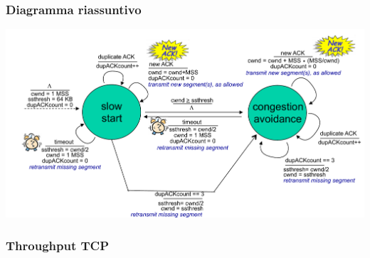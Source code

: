 \subsubsection*{Diagramma riassuntivo}
\includegraphics[width=\textwidth]{./img/diagrammacontrollodicongestione.png} \\

\subsubsection{Throughput TCP}
